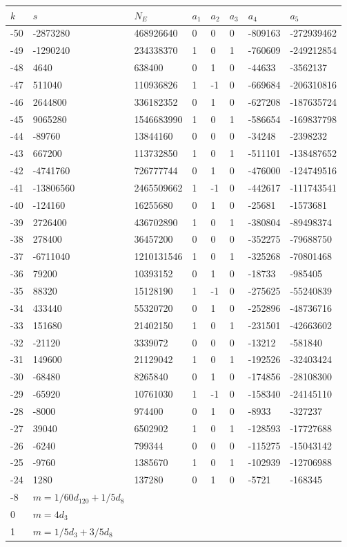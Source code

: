 \documentclass{amsart}
\begin{document}
\begin{longtable}{|l|l|l|lllll|}
\hline
$k$ & $s$ & $N_E$ & $a_1$ & $a_2$ & $a_3$ & $a_4$ & $a_5$\\
\hline
-50&-2873280&468926640&0&0&0&-809163&-272939462\\
-49&-1290240&234338370&1&0&1&-760609&-249212854\\
-48&4640&638400&0&1&0&-44633&-3562137\\
-47&511040&110936826&1&-1&0&-669684&-206310816\\
-46&2644800&336182352&0&1&0&-627208&-187635724\\
-45&9065280&1546683990&1&0&1&-586654&-169837798\\
-44&-89760&13844160&0&0&0&-34248&-2398232\\
-43&667200&113732850&1&0&1&-511101&-138487652\\
-42&-4741760&726777744&0&1&0&-476000&-124749516\\
-41&-13806560&2465509662&1&-1&0&-442617&-111743541\\
-40&-124160&16255680&0&1&0&-25681&-1573681\\
-39&2726400&436702890&1&0&1&-380804&-89498374\\
-38&278400&36457200&0&0&0&-352275&-79688750\\
-37&-6711040&1210131546&1&0&1&-325268&-70801468\\
-36&79200&10393152&0&1&0&-18733&-985405\\
-35&88320&15128190&1&-1&0&-275625&-55240839\\
-34&433440&55320720&0&1&0&-252896&-48736716\\
-33&151680&21402150&1&0&1&-231501&-42663602\\
-32&-21120&3339072&0&0&0&-13212&-581840\\
-31&149600&21129042&1&0&1&-192526&-32403424\\
-30&-68480&8265840&0&1&0&-174856&-28108300\\
-29&-65920&10761030&1&-1&0&-158340&-24145110\\
-28&-8000&974400&0&1&0&-8933&-327237\\
-27&39040&6502902&1&0&1&-128593&-17727688\\
-26&-6240&799344&0&0&0&-115275&-15043142\\
-25&-9760&1385670&1&0&1&-102939&-12706988\\
-24&1280&137280&0&1&0&-5721&-168345\\
-8&$m=1/60d_{120}+1/5d_{8}$&&\multicolumn{5}{c|}{}\\
0&$m=4d_{3}$&&\multicolumn{5}{c|}{}\\
1&$m=1/5d_{3}+3/5d_{8}$&&\multicolumn{5}{c|}{}\\
\hline
\end{longtable}
\end{document}
